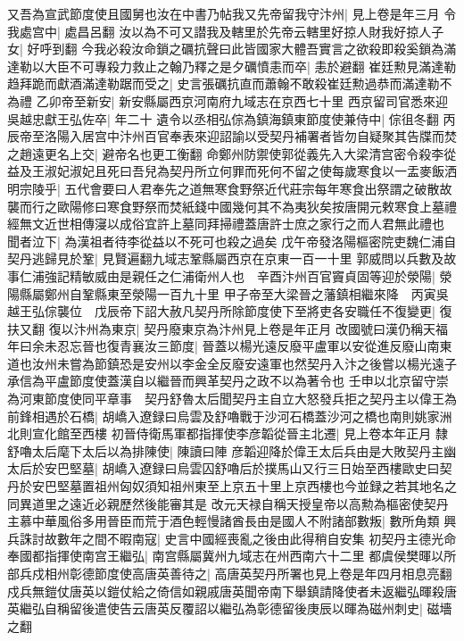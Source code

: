 又吾為宣武節度使且國舅也汝在中書乃帖我又先帝留我守汴州|{
	見上卷是年三月}
令我處宫中|{
	處昌呂翻}
汝以為不可又譛我及轄里於先帝云轄里好掠人財我好掠人子女|{
	好呼到翻}
今我必殺汝命鎖之礪抗聲曰此皆國家大體吾實言之欲殺即殺奚鎖為滿達勒以大臣不可專殺力救止之翰乃釋之是夕礪憤恚而卒|{
	恚於避翻}
崔廷勲見滿達勒趋拜跪而獻酒滿達勒踞而受之|{
	史言張礪抗直而蕭翰不敢殺崔廷勲過恭而滿達勒不為禮}
乙卯帝至新安|{
	新安縣屬西京河南府九域志在京西七十里}
西京留司官悉來迎　吳越忠獻王弘佐卒|{
	年二十}
遺令以丞相弘倧為鎮海鎮東節度使兼侍中|{
	倧徂冬翻}
丙辰帝至洛陽入居宫中汴州百官奉表來迎詔諭以受契丹補署者皆勿自疑聚其告牒而焚之趙遠更名上交|{
	避帝名也更工衡翻}
命鄭州防禦使郭從義先入大梁清宫密令殺李從益及王淑妃淑妃且死曰吾兒為契丹所立何罪而死何不留之使每歲寒食以一盂麥飯洒明宗陵乎|{
	五代會要曰人君奉先之道無寒食野祭近代莊宗每年寒食出祭謂之破散故襲而行之歐陽修曰寒食野祭而焚紙錢中國幾何其不為夷狄矣按唐開元敕寒食上墓禮經無文近世相傳寖以成俗宜許上墓同拜掃禮蓋唐許士庶之家行之而人君無此禮也}
聞者泣下|{
	為漢祖者待李從益以不死可也殺之過矣}
戊午帝發洛陽樞密院吏魏仁浦自契丹逃歸見於鞏|{
	見賢遍翻九域志鞏縣屬西京在京東一百一十里}
郭威問以兵數及故事仁浦強記精敏威由是親任之仁浦衛州人也　辛酉汴州百官竇貞固等迎於滎陽|{
	滎陽縣屬鄭州自鞏縣東至滎陽一百九十里}
甲子帝至大梁晉之藩鎮相繼來降　丙寅吳越王弘倧襲位　戊辰帝下詔大赦凡契丹所除節度使下至將吏各安職任不復變更|{
	復扶又翻}
復以汴州為東京|{
	契丹廢東京為汴州見上卷是年正月}
改國號曰漢仍稱天福年曰余未忍忘晉也復青襄汝三節度|{
	晉蓋以楊光遠反廢平盧軍以安從進反廢山南東道也汝州未嘗為節鎮恐是安州以李金全反廢安遠軍也然契丹入汴之後嘗以楊光遠子承信為平盧節度使蓋漢自以繼晉而興革契丹之政不以為著令也}
壬申以北京留守崇為河東節度使同平章事　契丹舒魯太后聞契丹主自立大怒發兵拒之契丹主以偉王為前鋒相遇於石橋|{
	胡嶠入遼録曰烏雲及舒嚕戰于沙河石橋蓋沙河之橋也南則姚家洲北則宣化館至西樓}
初晉侍衛馬軍都指揮使李彦韜從晉主北遷|{
	見上卷本年正月}
隸舒嚕太后麾下太后以為排陳使|{
	陳讀曰陣}
彦韜迎降於偉王太后兵由是大敗契丹主幽太后於安巴堅墓|{
	胡嶠入遼録曰烏雲囚舒嚕后於撲馬山又行三日始至西樓歐史曰契丹於安巴堅墓置祖州匈奴須知祖州東至上京五十里上京西樓也今並録之若其地名之同異道里之遠近必親歷然後能審其是}
改元天禄自稱天授皇帝以高勲為樞密使契丹主慕中華風俗多用晉臣而荒于酒色輕慢諸酋長由是國人不附諸部數叛|{
	數所角類}
興兵誅討故數年之間不暇南寇|{
	史言中國經喪亂之後由此得稍自安集}
初契丹主德光命奉國都指揮使南宫王繼弘|{
	南宫縣屬冀州九域志在州西南六十二里}
都虞侯樊暉以所部兵戍相州彰德節度使高唐英善待之|{
	高唐英契丹所署也見上卷是年四月相息亮翻}
戍兵無鎧仗唐英以鎧仗給之倚信如親戚唐英聞帝南下舉鎮請降使者未返繼弘暉殺唐英繼弘自稱留後遣使告云唐英反覆詔以繼弘為彰德留後庚辰以暉為磁州刺史|{
	磁墻之翻}
